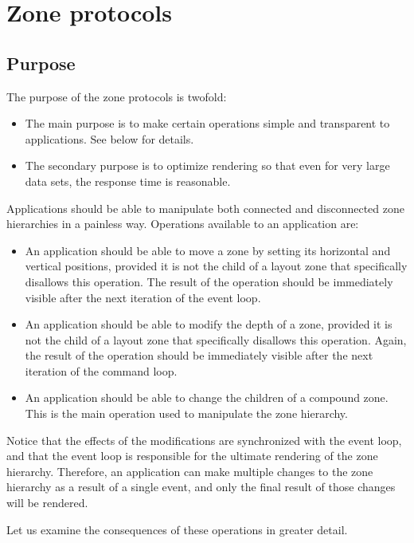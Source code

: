 \chapter{Zone protocols}

\section{Purpose}

The purpose of the zone protocols is twofold:

\begin{itemize}
\item The main purpose is to make certain operations simple and
  transparent to applications.  See below for details.
\item The secondary purpose is to optimize rendering so that even for
  very large data sets, the response time is reasonable.
\end{itemize}

Applications should be able to manipulate both connected and
disconnected zone hierarchies in a painless way.  Operations available
to an application are:

\begin{itemize}
\item An application should be able to move a zone by setting its
  horizontal and vertical positions, provided it is not the child of a
  layout zone that specifically disallows this operation.  The result
  of the operation should be immediately visible after the next
  iteration of the event loop.
\item An application should be able to modify the depth of a zone,
  provided it is not the child of a layout zone that specifically
  disallows this operation.  Again, the result of the operation should
  be immediately visible after the next iteration of the command
  loop. 
\item An application should be able to change the children of a
  compound zone.  This is the main operation used to manipulate the
  zone hierarchy.  
\end{itemize}

Notice that the effects of the modifications are synchronized with the
event loop, and that the event loop is responsible for the ultimate
rendering of the zone hierarchy.  Therefore, an application can make
multiple changes to the zone hierarchy as a result of a single event,
and only the final result of those changes will be rendered.  

Let us examine the consequences of these operations in greater
detail. 

